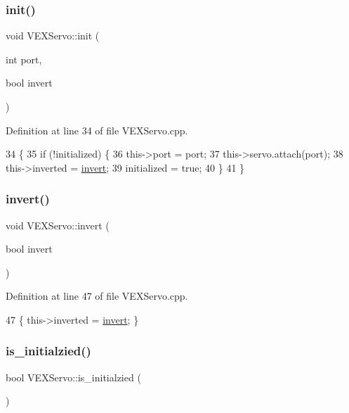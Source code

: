 \subsubsection{\texorpdfstring{init()}{init()}}
{\footnotesize\ttfamily void V\+E\+X\+Servo\+::init (\begin{DoxyParamCaption}\item[{int}]{port,  }\item[{bool}]{invert }\end{DoxyParamCaption})}



Definition at line 34 of file V\+E\+X\+Servo.\+cpp.


\begin{DoxyCode}
34                                          \{
35     \textcolor{keywordflow}{if} (!initialized) \{
36         this->port = port;
37         this->servo.attach(port);
38         this->inverted = \hyperlink{class_v_e_x_servo_a9bd31afec53e4c45d264c2480b0c0e5e}{invert};
39         initialized = \textcolor{keyword}{true};
40     \}
41 \}
\end{DoxyCode}
\mbox{\label{class_v_e_x_servo_a9bd31afec53e4c45d264c2480b0c0e5e}} 
\subsubsection{\texorpdfstring{invert()}{invert()}}
{\footnotesize\ttfamily void V\+E\+X\+Servo\+::invert (\begin{DoxyParamCaption}\item[{bool}]{invert }\end{DoxyParamCaption})}



Definition at line 47 of file V\+E\+X\+Servo.\+cpp.


\begin{DoxyCode}
47 \{ this->inverted = \hyperlink{class_v_e_x_servo_a9bd31afec53e4c45d264c2480b0c0e5e}{invert}; \}
\end{DoxyCode}
\mbox{\label{class_v_e_x_servo_ad9d2b11efe6ae96287482b0557ea4368}} 
\subsubsection{\texorpdfstring{is\+\_\+initialzied()}{is\_initialzied()}}
{\footnotesize\ttfamily bool V\+E\+X\+Servo\+::is\+\_\+initialzied (\begin{DoxyParamCaption}{ }\end{DoxyParamCaption})}



